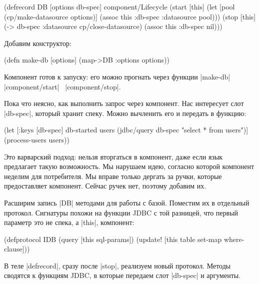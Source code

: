 \begin{english}
  \begin{clojure}
(defrecord DB [options db-spec]
  component/Lifecycle
  (start [this]
    (let [pool (cp/make-datasource options)]
      (assoc this :db-spec {:datasource pool})))
  (stop [this]
    (-> db-spec :datasource cp/close-datasource)
    (assoc this :db-spec nil)))
  \end{clojure}
\end{english}

\noindent
Добавим конструктор:

\begin{english}
  \begin{clojure}
(defn make-db [options]
  (map->DB {:options options}))
  \end{clojure}
\end{english}

Компонент готов к запуску: его можно прогнать через функции
\spverb|make-db|~\arr{} \spverb|component/start|~\arr{} \spverb|component/stop|.

Пока что неясно, как выполнить запрос через компонент. Нас интересует слот
\spverb|db-spec|, который хранит спеку. Можно вычленить его и передать в
функцию:

\begin{english}
  \begin{clojure}
(let [{:keys [db-spec]} db-started
      users (jdbc/query db-spec "select * from users")]
  (process-users users))
  \end{clojure}
\end{english}

Это варварский подход: нельзя вторгаться в компонент, даже если язык предлагает
такую возможность. Мы нарушаем идею, согласно которой компонент неделим для
потребителя. Мы вправе только дергать за ручки, которые предоставляет
компонент. Сейчас ручек нет, поэтому добавим их.

Расширим запись \spverb|DB| методами для работы с базой. Поместим их в отдельный
протокол. Сигнатуры похожи на функции JDBC с той разницей, что первый параметр
это не спека, а \spverb|this|, компонент:

\begin{english}
  \begin{clojure}
(defprotocol IDB
  (query [this sql-params])
  (update! [this table set-map where-clause]))
  \end{clojure}
\end{english}

В теле \spverb|defrecord|, сразу после \spverb|stop|, реализуем новый
протокол. Методы сводятся к функциям JDBC, в которые передаем слот
\spverb|db-spec| и аргументы.

